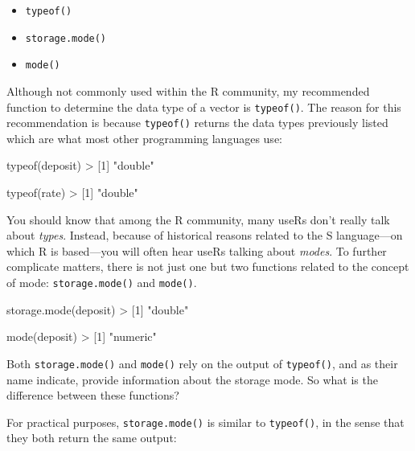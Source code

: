 \documentclass[
]{book}
\newenvironment{Shaded}{\begin{snugshade}}{\end{snugshade}}
\newcommand{\DecValTok}[1]{\textcolor[rgb]{0.00,0.00,0.81}{#1}}
\newcommand{\FunctionTok}[1]{\textcolor[rgb]{0.00,0.00,0.00}{#1}}
\newcommand{\NormalTok}[1]{#1}
\newcommand{\SpecialCharTok}[1]{\textcolor[rgb]{0.00,0.00,0.00}{#1}}
\newcommand{\StringTok}[1]{\textcolor[rgb]{0.31,0.60,0.02}{#1}}
\begin{document}
\begin{itemize}
\item
  \texttt{typeof()}
\item
  \texttt{storage.mode()}
\item
  \texttt{mode()}
\end{itemize}

Although not commonly used within the R community, my recommended function
to determine the data type of a vector is \texttt{typeof()}. The reason for this
recommendation is because \texttt{typeof()} returns the data types previously listed
which are what most other programming languages use:

\begin{Shaded}
\begin{Highlighting}[]
\FunctionTok{typeof}\NormalTok{(deposit)}
\SpecialCharTok{\textgreater{}}\NormalTok{ [}\DecValTok{1}\NormalTok{] }\StringTok{"double"}

\FunctionTok{typeof}\NormalTok{(rate)}
\SpecialCharTok{\textgreater{}}\NormalTok{ [}\DecValTok{1}\NormalTok{] }\StringTok{"double"}
\end{Highlighting}
\end{Shaded}

You should know that among the R community, many useRs don't really talk about
\emph{types}. Instead, because of historical reasons related to the S language---on
which R is based---you will often hear useRs talking about \emph{modes}. To further
complicate matters, there is not just one but two functions related to the
concept of mode: \texttt{storage.mode()} and \texttt{mode()}.

\begin{Shaded}
\begin{Highlighting}[]
\FunctionTok{storage.mode}\NormalTok{(deposit)}
\SpecialCharTok{\textgreater{}}\NormalTok{ [}\DecValTok{1}\NormalTok{] }\StringTok{"double"}

\FunctionTok{mode}\NormalTok{(deposit)}
\SpecialCharTok{\textgreater{}}\NormalTok{ [}\DecValTok{1}\NormalTok{] }\StringTok{"numeric"}
\end{Highlighting}
\end{Shaded}

Both \texttt{storage.mode()} and \texttt{mode()} rely on the output of \texttt{typeof()}, and as
their name indicate, provide information about the storage mode. So what is
the difference between these functions?

For practical purposes, \texttt{storage.mode()} is similar to \texttt{typeof()}, in the
sense that they both return the same output:
\end{document}

